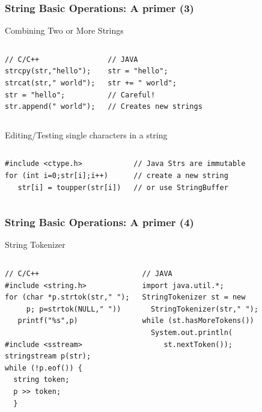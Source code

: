 \documentclass{beamer}
\begin{document}
\begin{frame}
  \frametitle{String Basic Operations: A primer (3)}
  {\smaller
    \begin{block}{Combining Two or More Strings}
      \begin{columns}[T]
\begin{verbatim}
// C/C++
strcpy(str,"hello");
strcat(str," world");
str = "hello";
str.append(" world");
\end{verbatim}
\begin{verbatim}
// JAVA
str = "hello";
str += " world"; 
// Careful! 
// Creates new strings
\end{verbatim}
      \end{columns}
    \end{block}
    \begin{block}{Editing/Testing single characters in a string}
      \begin{columns}[T]
\begin{verbatim}
#include <ctype.h>
for (int i=0;str[i];i++)
   str[i] = toupper(str[i])
\end{verbatim}
\begin{verbatim}
// Java Strs are immutable
// create a new string
// or use StringBuffer
\end{verbatim}
      \end{columns}
    \end{block}
  }
\end{frame}

\begin{frame}
  \frametitle{String Basic Operations: A primer (4)}
  {\smaller
    \begin{block}{String Tokenizer}
      \begin{columns}[T]
\begin{verbatim}
// C/C++
#include <string.h>
for (char *p.strtok(str," ");
     p; p=strtok(NULL," "))
   printf("%s",p)

#include <sstream>
stringstream p(str);
while (!p.eof()) {
  string token;
  p >> token;
  }
\end{verbatim}
\begin{verbatim}
// JAVA
import java.util.*;
StringTokenizer st = new
  StringTokenizer(str," ");
while (st.hasMoreTokens())
  System.out.println(
     st.nextToken());
\end{verbatim}
      \end{columns}
    \end{block}
    }
\end{frame}
\end{document}

